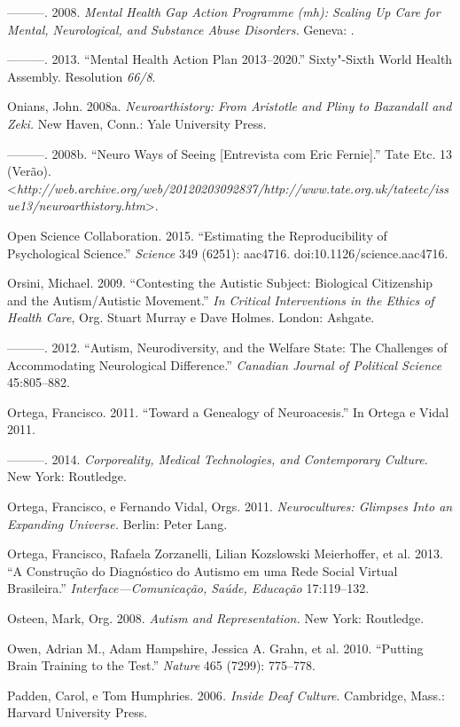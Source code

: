 ---------. 2008. \emph{Mental Health Gap Action Programme (mh):
Scaling Up Care for Mental, Neurological, and Substance Abuse
Disorders.} Geneva: .

---------. 2013. ``Mental Health Action Plan 2013--2020.'' Sixty"-Sixth
World Health Assembly. Resolution \emph{66/8}.

Onians, John. 2008a. \emph{Neuroarthistory: From Aristotle and Pliny to
Baxandall and Zeki.} New Haven, Conn.: Yale University Press.

---------. 2008b. ``Neuro Ways of Seeing {[}Entrevista com Eric
Fernie{]}.'' Tate Etc. 13 (Verão).
\textless{}\emph{http://web.archive.org/web/20120203092837/http://www.tate.org.uk/tateetc/issue13/neuroarthistory.htm}\textgreater{}.

Open Science Collaboration. 2015. ``Estimating the Reproducibility of
Psychological Science.'' \emph{Science} 349 (6251): aac4716.
doi:10.1126/science.aac4716.

Orsini, Michael. 2009. ``Contesting the Autistic Subject: Biological
Citizenship and the Autism/Autistic Movement.'' \emph{In Critical
Interventions in the Ethics of Health Care}, Org. Stuart Murray e Dave
Holmes. London: Ashgate.

---------. 2012. ``Autism, Neurodiversity, and the Welfare State: The
Challenges of Accommodating Neurological Difference.'' \emph{Canadian
Journal of Political Science} 45:805--882.

Ortega, Francisco. 2011. ``Toward a Genealogy of Neuroacesis.'' In
Ortega e Vidal 2011.

---------. 2014. \emph{Corporeality, Medical Technologies, and
Contemporary Culture.} New York: Routledge.

Ortega, Francisco, e Fernando Vidal, Orgs. 2011. \emph{Neurocultures:
Glimpses Into an Expanding Universe.} Berlin: Peter Lang.

Ortega, Francisco, Rafaela Zorzanelli, Lilian Kozslowski Meierhoffer, et
al. 2013. ``A Construção do Diagnóstico do Autismo em uma Rede Social
Virtual Brasileira.'' \emph{Interface---Comunicação, Saúde, Educação}
17:119--132.

Osteen, Mark, Org. 2008. \emph{Autism and Representation.} New York:
Routledge.

Owen, Adrian M., Adam Hampshire, Jessica A. Grahn, et al. 2010.
``Putting Brain Training to the Test.'' \emph{Nature} 465 (7299):
775--778.

Padden, Carol, e Tom Humphries. 2006\emph{. Inside Deaf Culture}.
Cambridge, Mass.: Harvard University Press.

